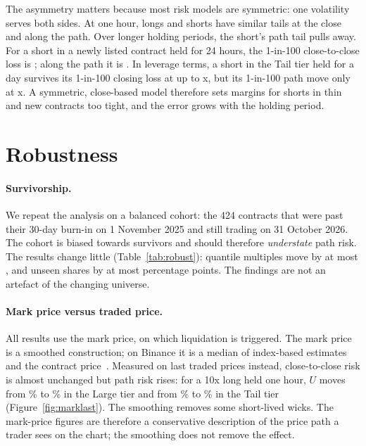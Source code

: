 The asymmetry matters because most risk models are symmetric: one volatility serves both sides. At
one hour, longs and shorts have similar tails at the close and along the path. Over longer holding
periods, the short's path tail pulls away. For a short in a newly listed contract held for 24 hours,
the 1-in-100 close-to-close loss is \NewDayShortQC; along the path it is \NewDayShortQP. In leverage
terms, a short in the Tail tier held for a day survives its 1-in-100 closing loss at up to
\LevCloseTailDayShort x, but its 1-in-100 path move only at \LevPathTailDayShort x. A symmetric,
close-based model therefore sets margins for shorts in thin and new contracts too tight, and the
error grows with the holding period.

\section{Robustness}
\label{sec:robust}

\paragraph{Survivorship.} We repeat the analysis on a balanced cohort: the 424 contracts that were
past their 30-day burn-in on 1 November 2025 and still trading on 31 October 2026. The cohort is
biased towards survivors and should therefore \emph{understate} path risk. The results change little
(Table~\ref{tab:robust}): quantile multiples move by at most \CohortMaxDK, and unseen shares by at
most \CohortMaxDU{} percentage points. The findings are not an artefact of the changing universe.

\paragraph{Mark price versus traded price.} All results use the mark price, on which liquidation is
triggered. The mark price is a smoothed construction; on Binance it is a median of index-based
estimates and the contract price~\cite{binance-mark}. Measured on last traded prices instead,
close-to-close risk is almost unchanged but path risk rises: for a 10x long held one hour, $U$ moves
from \RobLargeMark\% to \RobLargeLast\% in the Large tier and from \RobTailMark\% to \RobTailLast\% in
the Tail tier (Figure~\ref{fig:marklast}). The smoothing removes some short-lived wicks. The
mark-price figures are therefore a conservative description of the price path a trader sees on the
chart; the smoothing does not remove the effect.

